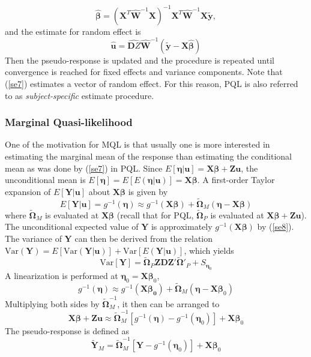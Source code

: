 	\begin{equation}
	\hat{\bm\beta} = (\bm X^T\hat{\bm W}^{-1} \bm X)^{-1}\bm X^T\hat{\bm W}^{-1}\bm X \tilde{\bm y},
	\end{equation}
	and the estimate for random effect is 
	\begin{equation}\label{se7}
	\hat{\bm u} = \hat{\bm DZ} \hat{\bm W}^{-1} (\tilde{\bm y}-\bm {X} \hat{\bm \beta})
	\end{equation}
	Then the pseudo-response is updated and the procedure is repeated until convergence is reached for fixed effects and variance components.  Note that (\ref{se7}) estimates a vector of random effect. For this reason, PQL is also referred to as \textit{subject-specific} estimate procedure. 
	
	\subsubsection{Marginal Quasi-likelihood} 
	One of the motivation for MQL is that usually one is more interested in estimating the marginal mean of the response than estimating the conditional mean as was done by (\ref{se7}) in PQL. Since $E[\bm \eta|\bm u]= \bm {X\beta} + \bm {Zu}$, the unconditional mean is $E[\bm \eta] = E[E(\bm \eta|\bm u)]= \bm {X\beta}$. A first-order Taylor expansion of $E[\bm Y|\bm u]$ about $\bm X \bm\beta$ is given by 
	\begin{equation}\label{se8}
	E[\bm Y|\bm u] = g^{-1}(\bm \eta) \approx g^{-1} (\bm{X\beta}) + \tilde{\bm \Omega}_{M} (\bm \eta - \bm X\bm \beta)
	\end{equation}
	where $\tilde{\bm \Omega}_{M}$ is evaluated at $\bm {X\beta}$ (recall that for PQL, $\tilde{\bm \Omega}_P$ is evaluated at $\bm {X\beta} + \bm {Zu}$). The unconditional expected value of  $\bm Y$ is approximately $g^{-1}(\bm {X\beta})$ by (\ref{se8}). The variance of $\bm Y$ can then be derived from the relation $\text{Var}(\bm Y)= E[\text{Var}(\bm Y|\bm u)] + \text{Var}[E(\bm Y| \bm u)]$, which yields
	\begin{equation}\label{se9}
	\text{Var}[\bm Y] = \tilde{\bm \Omega}_P \bm {ZDZ'}\tilde{\bm \Omega}'_P + S_{\bm \eta_0}
	\end{equation}
	A linearization is performed at $\bm \eta_0= \bm X \bm \beta_0$, 
	\[ g^{-1}(\bm \eta) \approx g^{-1} (\bm{X\beta_0}) + \tilde{\bm \Omega}_{M} (\bm \eta - \bm X\bm \beta_0)\]
	Multiplying both sides by $\tilde{\bm \Omega}_{M} ^{-1}$, it then can be arranged to 
	\[\bm {X\beta} + \bm {Zu} \approx \tilde{\bm \Omega}_M^{-1}[g^{-1}(\bm\eta)- g^{-1}(\bm \eta_0)]  + \bm{X}\bm \beta_0 \]
	The pseudo-response is defined as 
	\begin{equation}\label{se10}
	\tilde{\bm Y}_M =  \tilde{\bm \Omega}_M^{-1}[\bm Y- g^{-1}(\bm \eta_0)]  + \bm{X}\bm \beta_0 
	\end{equation}
	
